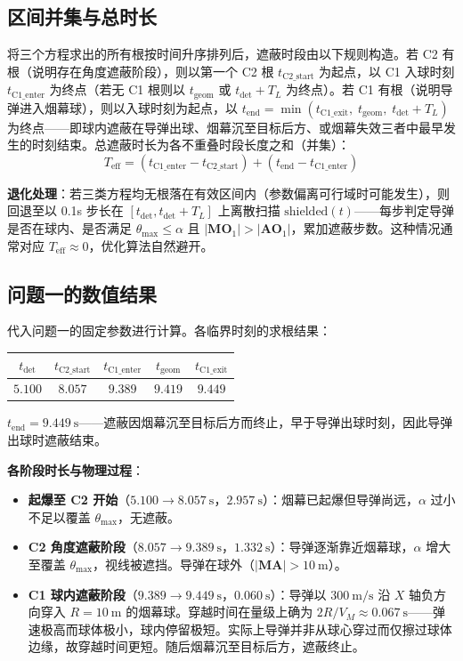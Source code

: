 \documentclass[12pt,a4paper]{ctexart}
\newcommand{\tdet}{t_{\text{det}}}
\newcommand{\Teff}{T_{\text{eff}}}
\newcommand{\MA}{|\mathbf{M}\mathbf{A}|}
\begin{document}
\subsection{区间并集与总时长}

将三个方程求出的所有根按时间升序排列后，遮蔽时段由以下规则构造。若 C2 有根（说明存在角度遮蔽阶段），则以第一个 C2 根 $t_{\text{C2\_start}}$ 为起点，以 C1 入球时刻 $t_{\text{C1\_enter}}$ 为终点（若无 C1 根则以 $t_{\text{geom}}$ 或 $\tdet+T_L$ 为终点）。若 C1 有根（说明导弹进入烟幕球），则以入球时刻为起点，以 $t_{\text{end}} = \min(t_{\text{C1\_exit}},\; t_{\text{geom}},\; \tdet+T_L)$ 为终点——即球内遮蔽在导弹出球、烟幕沉至目标后方、或烟幕失效三者中最早发生的时刻结束。总遮蔽时长为各不重叠时段长度之和（并集）：
\begin{equation}
\boxed{\Teff = (t_{\text{C1\_enter}} - t_{\text{C2\_start}}) + (t_{\text{end}} - t_{\text{C1\_enter}})}
\end{equation}

\textbf{退化处理}：若三类方程均无根落在有效区间内（参数偏离可行域时可能发生），则回退至以 0.1s 步长在 $[\tdet, \tdet+T_L]$ 上离散扫描 $\text{shielded}(t)$——每步判定导弹是否在球内、是否满足 $\theta_{\max} \leq \alpha$ 且 $|\mathbf{M}\mathbf{O}_1| > |\mathbf{A}\mathbf{O}_1|$，累加遮蔽步数。这种情况通常对应 $\Teff \approx 0$，优化算法自然避开。

\subsection{问题一的数值结果}

代入问题一的固定参数进行计算。各临界时刻的求根结果：
\begin{center}
\begin{tabular}{c|c|c|c|c}
\toprule
$\tdet$ & $t_{\text{C2\_start}}$ & $t_{\text{C1\_enter}}$ & $t_{\text{geom}}$ & $t_{\text{C1\_exit}}$ \\
\midrule
$5.100$ & $8.057$ & $9.389$ & $9.419$ & $ 9.449$ \\
\bottomrule
\end{tabular}
\end{center}

$t_{\text{end}} = 9.449\ \mathrm{s}$——遮蔽因烟幕沉至目标后方而终止，早于导弹出球时刻，因此导弹出球时遮蔽结束。

\textbf{各阶段时长与物理过程}：
\begin{itemize}
    \item \textbf{起爆至 C2 开始}（$5.100 \to 8.057\ \mathrm{s}$，$2.957\ \mathrm{s}$）：烟幕已起爆但导弹尚远，$\alpha$ 过小不足以覆盖 $\theta_{\max}$，无遮蔽。
    \item \textbf{C2 角度遮蔽阶段}（$8.057 \to 9.389\ \mathrm{s}$，$\mathbf{1.332\ \mathrm{s}}$）：导弹逐渐靠近烟幕球，$\alpha$ 增大至覆盖 $\theta_{\max}$，视线被遮挡。导弹在球外（$\MA > 10\ \mathrm{m}$）。
    \item \textbf{C1 球内遮蔽阶段}（$9.389 \to  9.449\ \mathrm{s}$，$\mathbf{0.060\ \mathrm{s}}$）：导弹以 $300\ \mathrm{m/s}$ 沿 $X$ 轴负方向穿入 $R = 10\ \mathrm{m}$ 的烟幕球。穿越时间在量级上确为 $2R / V_M \approx 0.067\ \mathrm{s}$——弹速极高而球体极小，球内停留极短。实际上导弹并非从球心穿过而仅擦过球体边缘，故穿越时间更短。随后烟幕沉至目标后方，遮蔽终止。
\end{itemize}
\end{document}
